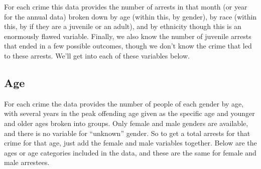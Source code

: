 \documentclass[
  12pt,
  openany]{book}
\begin{document}
For each crime this data provides the number of arrests in that month (or year for the annual data) broken down by age (within this, by gender), by race (within this, by if they are a juvenile or an adult), and by ethnicity though this is an enormously flawed variable. Finally, we also know the number of juvenile arrests that ended in a few possible outcomes, though we don't know the crime that led to these arrests. We'll get into each of these variables below.

\hypertarget{age}{%
\subsection{Age}\label{age}}

For each crime the data provides the number of people of each gender by age, with several years in the peak offending age given as the specific age and younger and older ages broken into groups. Only female and male genders are available, and there is no variable for ``unknown'' gender. So to get a total arrests for that crime for that age, just add the female and male variables together. Below are the ages or age categories included in the data, and these are the same for female and male arrestees.
\end{document}
